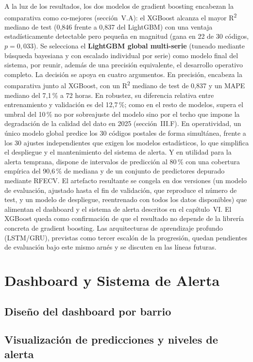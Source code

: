 \documentclass[12pt, a4paper]{article}
\begin{document}
A la luz de los resultados, los dos modelos de gradient boosting encabezan la comparativa como co-mejores (sección~V.A): el XGBoost alcanza el mayor R\textsuperscript{2} mediano de test (0,846 frente a 0,837 del LightGBM) con una ventaja estadísticamente detectable pero pequeña en magnitud (gana en 22 de 30 códigos, $p=0{,}033$). Se selecciona el \textbf{LightGBM global multi-serie} (tuneado mediante búsqueda bayesiana y con escalado individual por serie) como modelo final del sistema, por reunir, además de una precisión equivalente, el desarrollo operativo completo. La decisión se apoya en cuatro argumentos. En precisión, encabeza la comparativa junto al XGBoost, con un R\textsuperscript{2} mediano de test de 0,837 y un MAPE mediano del 7,1\,\% a 72 horas. En robustez, su diferencia relativa entre entrenamiento y validación es del 12,7\,\%; como en el resto de modelos, supera el umbral del 10\,\% no por sobreajuste del modelo sino por el techo que impone la degradación de la calidad del dato en 2025 (sección~III.F). En operatividad, un único modelo global predice los 30 códigos postales de forma simultánea, frente a los 30 ajustes independientes que exigen los modelos estadísticos, lo que simplifica el despliegue y el mantenimiento del sistema de alerta. Y en utilidad para la alerta temprana, dispone de intervalos de predicción al 80\,\% con una cobertura empírica del 90,6\,\% de mediana y de un conjunto de predictores depurado mediante RFECV. El artefacto resultante se congela en dos versiones (un modelo de evaluación, ajustado hasta el fin de validación, que reproduce el número de test, y un modelo de despliegue, reentrenado con todos los datos disponibles) que alimentan el dashboard y el sistema de alerta descritos en el capítulo~VI. El XGBoost queda como confirmación de que el resultado no depende de la librería concreta de gradient boosting. Las arquitecturas de aprendizaje profundo (LSTM/GRU), previstas como tercer escalón de la progresión, quedan pendientes de evaluación bajo este mismo arnés y se discuten en las líneas futuras.

\section{Dashboard y Sistema de Alerta}

\subsection{Diseño del dashboard por barrio}
\subsection{Visualización de predicciones y niveles de alerta}
\end{document}
